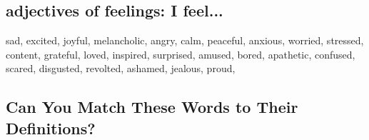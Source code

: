 \documentclass[]{article} %
\begin{document}


\iffalse
Notes:

Language Level: This dialogue is simple and uses vocabulary that is likely familiar to ESL students (e.g., sad, happy, excited, thoughtful).
Emotions: The scene explores basic emotions (sadness, happiness, excitement) that are easily relatable for young learners.
Musical Concepts: It introduces the idea that different types of music can evoke different emotions and that music can communicate without words.
Let me know if you'd like any adjustments or other scenes!
\fi

\subsection{adjectives of feelings: I feel...}

sad, excited, joyful, melancholic, angry, calm, peaceful, anxious, worried, stressed, content, grateful, loved, inspired, surprised, amused, bored, apathetic, confused, scared,  disgusted, revolted, ashamed, jealous, proud, 

\subsection{Can You Match These Words to Their Definitions?}
\end{document}
